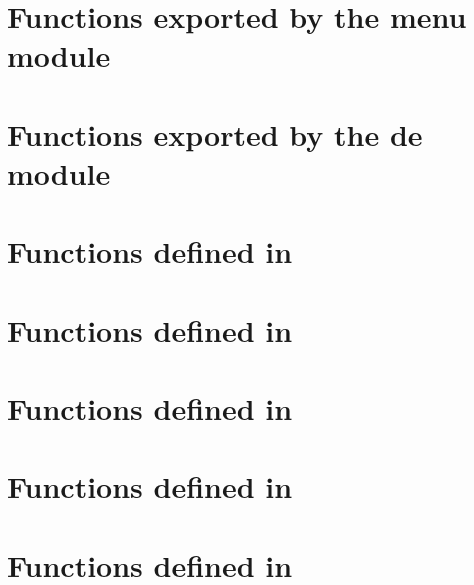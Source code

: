 \documentclass[english,a4paper,11pt,oldtoc,mctitle]{rapport3}
\begin{document}


\section{Functions exported by the menu module}
\label{sec:queryref}



\section{Functions exported by the de module}
\label{sec:menuref}





\section{Functions defined in }
\label{sec:ioncorelibref}



\section{Functions defined in }
\label{sec:mplexfnsref}



\section{Functions defined in }
\label{sec:querylibref}



\section{Functions defined in }
\label{sec:delibref}



\section{Functions defined in }
\label{sec:menulibref}



\appendix



\printindex
\end{document}
